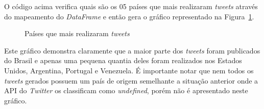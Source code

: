 O código acima verifica quais são os 05 países que mais realizaram \textit{tweets} através do mapeamento do \textit{DataFrame} e então gera o gráfico representado na Figura~\ref{paises}.

\begin{figure}[h]
	\centering
	\caption{Países que mais realizaram \textit{tweets}}
	\vspace{-0.3cm}
	\label{paises}
\end{figure}

Este gráfico demonstra claramente que a maior parte dos \textit{tweets} foram publicados do Brasil e apenas uma pequena quantia deles foram realizados nos Estados Unidos, Argentina, Portugal e Venezuela. É importante notar que nem todos os \textit{tweets} gerados possuem um país de origem semelhante a situação anterior onde a API do \textit{Twitter} os classificam como \textit{undefined}, porém não é apresentado neste gráfico.

